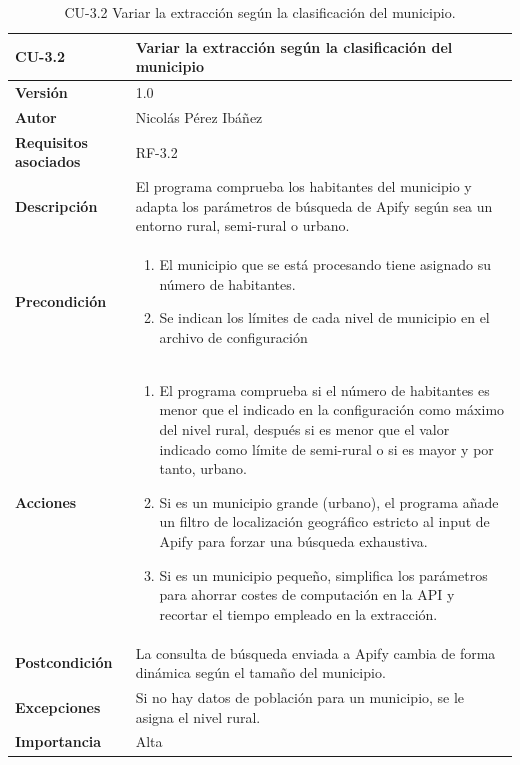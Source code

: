 \begin{table}[p]
	\centering
	\begin{tabularx}{\linewidth}{ p{} p{} }
		\toprule
		\textbf{CU-3.2}  & \textbf{Variar la extracción según la clasificación del municipio}\\
		\toprule
		\textbf{Versión}              & 1.0    \\
		\textbf{Autor}                & Nicolás Pérez Ibáñez \\
		\textbf{Requisitos asociados} & RF-3.2 \\
		\textbf{Descripción}          & El programa comprueba los habitantes del municipio y adapta los parámetros de búsqueda de Apify según sea un entorno rural, semi-rural o urbano. \\
		\textbf{Precondición}         & 
        \begin{enumerate}
			\def\labelenumi{\arabic{enumi}.}
			\tightlist
			\item El municipio que se está procesando tiene asignado su número de habitantes.
            \item Se indican los límites de cada nivel de municipio en el archivo de configuración
        \end{enumerate}\\
		\textbf{Acciones}             &
		\begin{enumerate}
			\def\labelenumi{\arabic{enumi}.}
			\tightlist
			\item El programa comprueba si el número de habitantes es menor que el indicado en la configuración como máximo del nivel rural, después si es menor que el valor indicado como límite de semi-rural o si es mayor y por tanto, urbano.
			\item Si es un municipio grande (urbano), el programa añade un filtro de localización geográfico estricto al input de Apify para forzar una búsqueda exhaustiva.
			\item Si es un municipio pequeño, simplifica los parámetros para ahorrar costes de computación en la API y recortar el tiempo empleado en la extracción.
		\end{enumerate}\\
		\textbf{Postcondición}        & La consulta de búsqueda enviada a Apify cambia de forma dinámica según el tamaño del municipio. \\
		\textbf{Excepciones}          & Si no hay datos de población para un municipio, se le asigna el nivel rural. \\
		\textbf{Importancia}          & Alta \\
		\bottomrule
	\end{tabularx}
	\caption{CU-3.2 Variar la extracción según la clasificación del municipio.}
\end{table}

